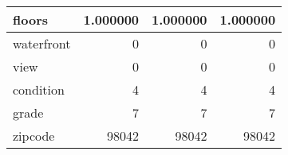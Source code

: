 \begin{table}[H]
\begin{tabular}{|l|r|r|r|}
\hline floors & \cellcolor[rgb]{0.9, 0.54, 0.52} 1.000000 & \cellcolor[rgb]{0.9, 0.54, 0.52} 1.000000 & \cellcolor[rgb]{0.9, 0.54, 0.52} 1.000000 \\
\hline waterfront & \cellcolor[rgb]{0.9, 0.54, 0.52} 0 & \cellcolor[rgb]{0.9, 0.54, 0.52} 0 & \cellcolor[rgb]{0.9, 0.54, 0.52} 0 \\
\hline view & \cellcolor[rgb]{0.9, 0.54, 0.52} 0 & \cellcolor[rgb]{0.9, 0.54, 0.52} 0 & \cellcolor[rgb]{0.9, 0.54, 0.52} 0 \\
\hline condition & \cellcolor[rgb]{0.9, 0.54, 0.52} 4 & \cellcolor[rgb]{0.9, 0.54, 0.52} 4 & \cellcolor[rgb]{0.9, 0.54, 0.52} 4 \\
\hline grade & \cellcolor[rgb]{0.9, 0.54, 0.52} 7 & \cellcolor[rgb]{0.9, 0.54, 0.52} 7 & \cellcolor[rgb]{0.9, 0.54, 0.52} 7 \\
\hline zipcode & \cellcolor[rgb]{0.9, 0.54, 0.52} 98042 & \cellcolor[rgb]{0.9, 0.54, 0.52} 98042 & \cellcolor[rgb]{0.9, 0.54, 0.52} 98042 \\
\hline
\end{tabular}
\end{table}
